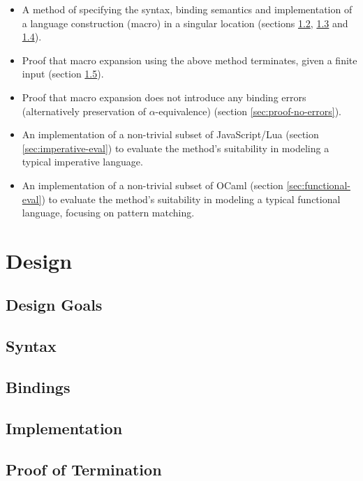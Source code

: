\documentclass{kththesis}
\begin{document}
\begin{itemize}
  \item A method of specifying the syntax, binding semantics and implementation of a language construction (macro) in a singular location (sections \ref{sec:design-syntax}, \ref{sec:design-bindings} and \ref{sec:design-implementation}).
  \item Proof that macro expansion using the above method terminates, given a finite input (section \ref{sec:proof-termination}).
  \item Proof that macro expansion does not introduce any binding errors (alternatively preservation of $\alpha$-equivalence) (section \ref{sec:proof-no-errors}).
  \item An implementation of a non-trivial subset of JavaScript/Lua (section \ref{sec:imperative-eval}) to evaluate the method's suitability in modeling a typical imperative language.
  \item An implementation of a non-trivial subset of OCaml (section \ref{sec:functional-eval}) to evaluate the method's suitability in modeling a typical functional language, focusing on pattern matching.
\end{itemize}

\chapter{Design}

\section{Design Goals}

\section{Syntax} \label{sec:design-syntax}

\section{Bindings} \label{sec:design-bindings}

\section{Implementation} \label{sec:design-implementation}

\section{Proof of Termination} \label{sec:proof-termination}
\end{document}
